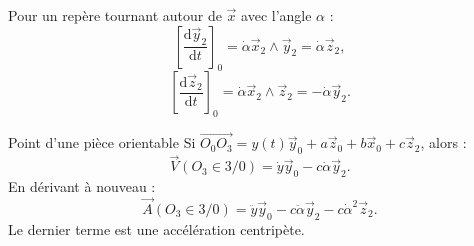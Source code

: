 Pour un repère tournant autour de $\vec x$ avec l'angle $\alpha$ :
\[
\left[\frac{\mathrm d\vec y_2}{\mathrm dt}\right]_0
=\dot\alpha\vec x_2\wedge\vec y_2
=\dot\alpha\vec z_2,
\]
\[
\left[\frac{\mathrm d\vec z_2}{\mathrm dt}\right]_0
=\dot\alpha\vec x_2\wedge\vec z_2
=-\dot\alpha\vec y_2.
\]

\begin{TLCineApp}{Point d'une pièce orientable}
Si
$\overrightarrow{O_0O_3}=y(t)\vec y_0+a\vec z_0+b\vec x_0+c\vec z_2$,
alors :
\[
\vec V(O_3\in3/0)
=\dot y\vec y_0-c\dot\alpha\vec y_2.
\]
En dérivant à nouveau :
\[
\vec A(O_3\in3/0)
=\ddot y\vec y_0-c\ddot\alpha\vec y_2
-c\dot\alpha^2\vec z_2.
\]
Le dernier terme est une accélération centripète.
\end{TLCineApp}
